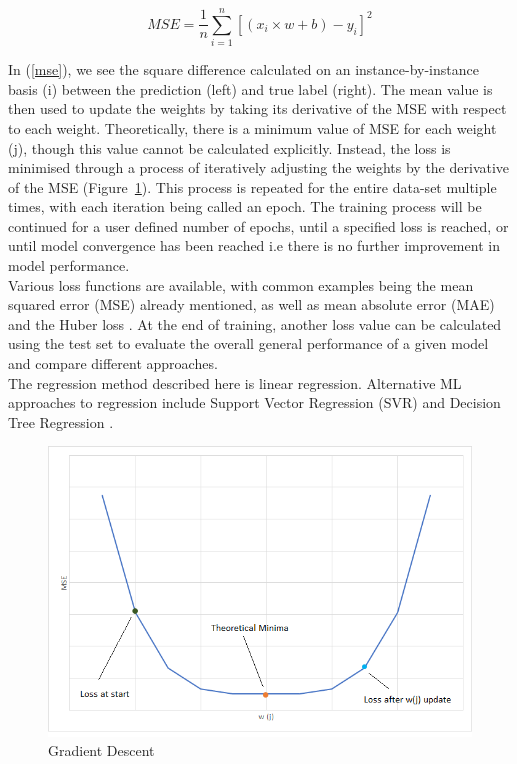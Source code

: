 \begin{equation} \label{mse}
	MSE = \frac{1}{n}\sum_{i=1}^n [(x_i \times w + b) - y_i]^2
\end{equation}

\noindent
In (\ref{mse}), we see the square difference calculated on an instance-by-instance basis (i) between the prediction (left) and true label (right). The mean value is then used to update the weights by taking its derivative of the MSE with respect to each weight. Theoretically, there is a minimum value of MSE for each weight (j), though this value cannot be calculated explicitly. Instead, the loss is minimised through a process of iteratively adjusting the weights by the derivative of the MSE (Figure~\ref{fig:GRA}). This process is repeated for the entire data-set multiple times, with each iteration being called an epoch. The training process will be continued for a user defined number of epochs, until a specified loss is reached, or until model convergence has been reached i.e there is no further improvement in model performance.
\\

\noindent
Various loss functions are available, with common examples being the mean squared error (MSE) already mentioned, as well as mean absolute error (MAE) and the Huber loss \cite{huber1964robust}. At the end of training, another loss value can be calculated using the test set to evaluate the overall general performance of a given model and compare different approaches.   
\\

\noindent
The regression method described here is linear regression. Alternative ML approaches to regression include Support Vector Regression (SVR) \cite{awad2015support} and Decision Tree Regression \cite{loh2014classification}.


\begin{figure}[ht]
	\centering
	\includegraphics[scale=0.4]{Figures/gradient_descent.png}
	\caption{Gradient Descent}
	\label{fig:GRA}
\end{figure}

